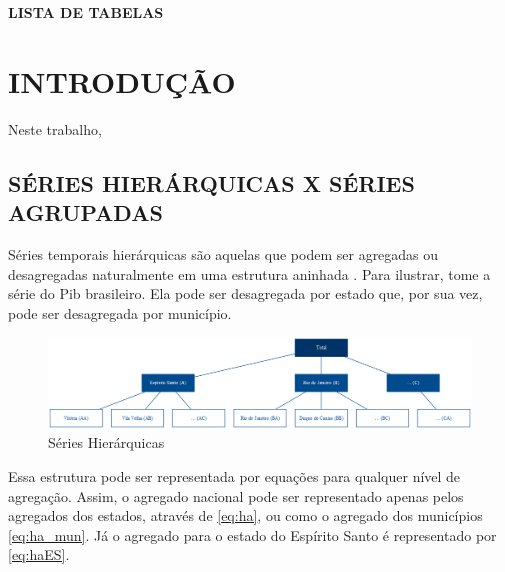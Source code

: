 \documentclass[
  12pt,
  letterpaper,
  DIV=11,
  numbers=noendperiod]{scrartcl}
\begin{document}
\newpage
\begin{center}
\MakeUppercase{\textbf{LISTA DE TABELAS}}
\end{center}
\begin{center}
\listoftables
\end{center}
\thispagestyle{empty}
\endgroup

\newpage

\hypertarget{introduuxe7uxe3o}{%
\section*{INTRODUÇÃO}\label{introduuxe7uxe3o}}

Neste trabalho,

\hypertarget{suxe9ries-hieruxe1rquicas-x-suxe9ries-agrupadas}{%
\subsection*{SÉRIES HIERÁRQUICAS X SÉRIES
AGRUPADAS}\label{suxe9ries-hieruxe1rquicas-x-suxe9ries-agrupadas}}

Séries temporais hierárquicas são aquelas que podem ser agregadas ou
desagregadas naturalmente em uma estrutura aninhada \citep{hyndman2021}.
Para ilustrar, tome a série do Pib brasileiro. Ela pode ser desagregada
por estado que, por sua vez, pode ser desagregada por município.

\begin{figure}

{\centering \includegraphics{img/hierarq.png}

}

\caption{\label{fig-h}Séries Hierárquicas}

\end{figure}

Essa estrutura pode ser representada por equações para qualquer nível de
agregação. Assim, o agregado nacional pode ser representado apenas pelos
agregados dos estados, através de \eqref{eq:ha}, ou como o agregado dos
municípios \eqref{eq:ha_mun}. Já o agregado para o estado do Espírito
Santo é representado por \eqref{eq:haES}.
\end{document}
